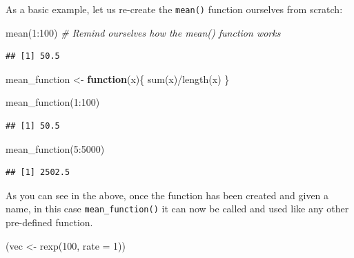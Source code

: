 \documentclass[
]{book}
\newenvironment{Shaded}{\begin{snugshade}}{\end{snugshade}}
\newcommand{\AttributeTok}[1]{\textcolor[rgb]{0.77,0.63,0.00}{#1}}
\newcommand{\CommentTok}[1]{\textcolor[rgb]{0.56,0.35,0.01}{\textit{#1}}}
\newcommand{\ControlFlowTok}[1]{\textcolor[rgb]{0.13,0.29,0.53}{\textbf{#1}}}
\newcommand{\DecValTok}[1]{\textcolor[rgb]{0.00,0.00,0.81}{#1}}
\newcommand{\FunctionTok}[1]{\textcolor[rgb]{0.00,0.00,0.00}{#1}}
\newcommand{\NormalTok}[1]{#1}
\newcommand{\OtherTok}[1]{\textcolor[rgb]{0.56,0.35,0.01}{#1}}
\newcommand{\SpecialCharTok}[1]{\textcolor[rgb]{0.00,0.00,0.00}{#1}}
\theoremstyle{definition}
\theoremstyle{definition}
\theoremstyle{definition}
\theoremstyle{definition}
\theoremstyle{remark}
\begin{document}
As a basic example, let us re-create the \texttt{mean()} function ourselves from scratch:

\begin{Shaded}
\begin{Highlighting}[]
\FunctionTok{mean}\NormalTok{(}\DecValTok{1}\SpecialCharTok{:}\DecValTok{100}\NormalTok{) }\CommentTok{\# Remind ourselves how the mean() function works}
\end{Highlighting}
\end{Shaded}

\begin{verbatim}
## [1] 50.5
\end{verbatim}

\begin{Shaded}
\begin{Highlighting}[]
\NormalTok{mean\_function }\OtherTok{\textless{}{-}} \ControlFlowTok{function}\NormalTok{(x)\{}
  \FunctionTok{sum}\NormalTok{(x)}\SpecialCharTok{/}\FunctionTok{length}\NormalTok{(x)}
\NormalTok{\}}

\FunctionTok{mean\_function}\NormalTok{(}\DecValTok{1}\SpecialCharTok{:}\DecValTok{100}\NormalTok{)}
\end{Highlighting}
\end{Shaded}

\begin{verbatim}
## [1] 50.5
\end{verbatim}

\begin{Shaded}
\begin{Highlighting}[]
\FunctionTok{mean\_function}\NormalTok{(}\DecValTok{5}\SpecialCharTok{:}\DecValTok{5000}\NormalTok{)}
\end{Highlighting}
\end{Shaded}

\begin{verbatim}
## [1] 2502.5
\end{verbatim}

As you can see in the above, once the function has been created and given a name, in this case \texttt{mean\_function()} it can now be called and used like any other pre-defined function.

\begin{Shaded}
\begin{Highlighting}[]
\NormalTok{(vec }\OtherTok{\textless{}{-}} \FunctionTok{rexp}\NormalTok{(}\DecValTok{100}\NormalTok{, }\AttributeTok{rate =} \DecValTok{1}\NormalTok{))}
\end{Highlighting}
\end{Shaded}
\end{document}
